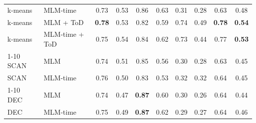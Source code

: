 \begin{table}[t]
\begin{tabular}{llcccccc|cc}
k-means & MLM-time & 0.73 & 0.53 & 0.86 & 0.63 & 0.31 & 0.28 & 0.63 & 0.48 \\
k-means & MLM + ToD & \textbf{0.78} & 0.53 & 0.82 & 0.59 & 0.74 & 0.49 & \textbf{0.78} & \textbf{0.54} \\
k-means & MLM-time + ToD & 0.75 & 0.54 & 0.84 & 0.62 & 0.73 & 0.44 & 0.77 & \textbf{0.53} \\
\cmidrule{1-10}
SCAN & MLM & 0.74 & 0.51 & 0.85 & 0.56 & 0.30 & 0.28 & 0.63 & 0.45 \\
SCAN & MLM-time & 0.76 & 0.50 & 0.83 & 0.53 & 0.32 & 0.32 & 0.64 & 0.45 \\
\cmidrule{1-10}
DEC & MLM & 0.74 & 0.47 & \textbf{0.87} & 0.60 & 0.30 & 0.26 & 0.64 & 0.44 \\
DEC & MLM-time & 0.75 & 0.49 & \textbf{0.87} & 0.62 & 0.29 & 0.27 & 0.64 & 0.46 \\
\bottomrule
\end{tabular}
\end{table}
